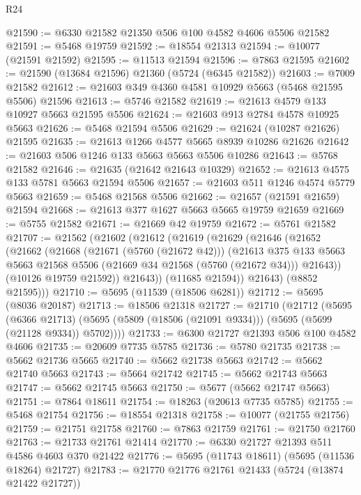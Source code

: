 \begin{lexlean}{R24}
\begin{coremodule}
@21590 := @6330 @21582 @21350 @506 @100 @4582 @4606 @5506 @21582
@21591 := @5468 @19759
@21592 := @18554 @21313
@21594 := @10077 (@21591 @21592)
@21595 := @11513 @21594
@21596 := @7863 @21595
@21602 := @21590 (@13684 @21596) @21360 (@5724 (@6345 @21582))
@21603 := @7009 @21582
@21612 := @21603 @349 @4360 @4581 @10929 @5663 (@5468 @21595 @5506) @21596
@21613 := @5746 @21582
@21619 := @21613 @4579 @133 @10927 @5663 @21595 @5506
@21624 := @21603 @913 @2784 @4578 @10925 @5663
@21626 := @5468 @21594 @5506
@21629 := @21624 (@10287 @21626) @21595
@21635 := @21613 @1266 @4577 @5665 @8939 @10286 @21626
@21642 := @21603 @506 @1246 @133 @5663 @5663 @5506 @10286
@21643 := @5768 @21582
@21646 := @21635 (@21642 @21643 @10329)
@21652 := @21613 @4575 @133 @5781 @5663 @21594 @5506
@21657 := @21603 @511 @1246 @4574 @5779 @5663
@21659 := @5468 @21568 @5506
@21662 := @21657 (@21591 @21659) @21594
@21668 := @21613 @377 @1627 @5663 @5665 @19759 @21659
@21669 := @5755 @21582
@21671 := @21669 @42 @19759
@21672 := @5761 @21582
@21707 := @21562
    (@21602
      (@21612
        (@21619
          (@21629
            (@21646
              (@21652
                (@21662
                  (@21668
                    (@21671 (@5760 (@21672 @42)))
                    (@21613
                      @375
                      @133
                      @5663
                      @5663
                      @21568
                      @5506
                      (@21669 @34 @21568 (@5760 (@21672 @34)))
                      @21643))
                  (@10126 @19759 @21592))
                @21643))
            (@11685 @21594))
          @21643)
        (@8852 @21595)))
@21710 := @5695 (@11539 (@18506 @6281))
@21712 := @5695 (@8036 @20187)
@21713 := @18506 @21318
@21727 := @21710
    (@21712
      (@5695
        (@6366 @21713)
        (@5695 (@5809 (@18506 (@21091 @9334))) (@5695 (@5699 (@21128 @9334)) @5702))))
@21733 := @6300 @21727 @21393 @506 @100 @4582 @4606
@21735 := @20609 @7735 @5785
@21736 := @5780 @21735
@21738 := @5662 @21736 @5665
@21740 := @5662 @21738 @5663
@21742 := @5662 @21740 @5663
@21743 := @5664 @21742
@21745 := @5662 @21743 @5663
@21747 := @5662 @21745 @5663
@21750 := @5677 (@5662 @21747 @5663)
@21751 := @7864 @18611
@21754 := @18263 (@20613 @7735 @5785)
@21755 := @5468 @21754
@21756 := @18554 @21318
@21758 := @10077 (@21755 @21756)
@21759 := @21751 @21758
@21760 := @7863 @21759
@21761 := @21750 @21760
@21763 := @21733 @21761 @21414
@21770 := @6330 @21727 @21393 @511 @4586 @4603 @370 @21422
@21776 := @5695 (@11743 @18611) (@5695 (@11536 @18264) @21727)
@21783 := @21770 @21776 @21761 @21433 (@5724 (@13874 @21422 @21727))

\end{coremodule}
\end{lexlean}
